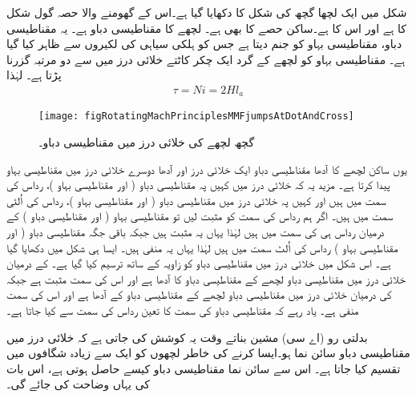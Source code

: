 شکل   میں ایک لچھا گچھ کی شکل کا دکھایا گیا ہے۔اس کے گھومنے والا حصہ گول شکل کا ہے اور اس کا  ہے۔ساکن حصے کا بھی  ہے۔ لچھے کا مقناطیسی دباو  ہے۔  یہ مقناطیسی دباو، مقناطیسی بہاو   کو جنم دیتا ہے جس کو ہلکی سیاہی کی  لکیروں سے ظاہر کیا گیا ہے۔ مقناطیسی بہاو کو لچھے کے گرد ایک چکر کاٹتے خلائی درز میں سے دو مرتبہ گزرنا پڑتا ہے۔ لہٰذا
\begin{align}
\tau=N i=2 H l_a
\end{align}
%
\begin{figure}
\centering
\texttt{[image: figRotatingMachPrinciplesMMFjumpsAtDotAndCross]}
\caption{گچھ لچھے کی خلائی درز میں مقناطیسی دباو۔}
\label{شکل_گھومتے_مشین_گچھ_لچھے_کا_دباو}
\end{figure}

یوں ساکن لچھے کا آدھا مقناطیسی دباو ایک خلائی درز اور آدھا دوسرے خلائی درز میں مقناطیسی بہاو پیدا کرتا ہے۔ مزید یہ کہ خلائی درز میں کہیں پہ مقناطیسی دباو ( اور  مقناطیسی بہاو )،  رداس کی سمت میں ہیں اور کہیں  پہ خلائی درز میں مقناطیسی دباو ( اور مقناطیسی بہاو )، رداس کی اُلٹی سمت میں ہیں۔ اگر ہم رداس کی سمت کو مثبت لیں تو   مقناطیسی بہاو ( اور مقناطیسی دباو )  کے درمیان رداس ہی کی  سمت میں ہیں لہٰذا یہاں  یہ مثبت ہیں جبکہ باقی جگہ  مقناطیسی دباو ( اور مقناطیسی بہاو ) رداس کی اُلٹ سمت میں ہیں لہٰذا یہاں یہ منفی ہیں۔ ایسا ہی شکل   میں دکھایا گیا ہے۔ اس شکل میں خلائی درز میں مقناطیسی دباو کو زاویہ کے ساتھ ترسیم کیا گیا ہے۔ کے درمیان خلائی درز میں مقناطیسی دباو  لچھے کے مقناطیسی دباو  کا آدھا ہے اور اس کی سمت مثبت ہے جبکہ  کی درمیان خلائی درز میں مقناطیسی دباو لچھے کے مقناطیسی دباو کے آدھا ہے اور اس کی سمت منفی ہے۔ یاد رہے کہ مقناطیسی دباو کی سمت کا تعین رداس کی سمت سے کیا جاتا ہے۔

بدلتی رو (اے سی) مشین بناتے وقت یہ کوشش کی جاتی ہے کہ خلائی درز میں مقناطیسی دباو سائن نما ہو۔ایسا کرنے کی خاطر لچھوں کو ایک سے زیادہ شگافوں میں تقسیم کیا جاتا ہے۔ اس سے سائن نما مقناطیسی دباو کیسے حاصل ہوتی ہے، اس بات کی  یہاں وضاحت کی جائے گی۔

